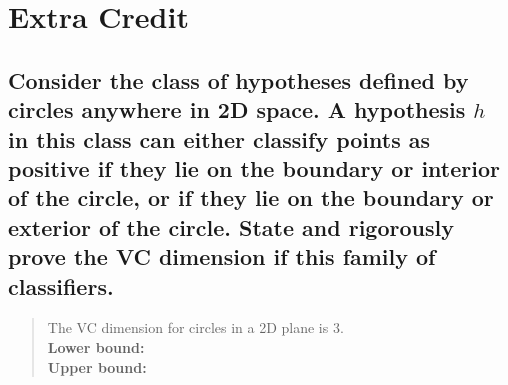 \documentclass[11pt]{article}
\begin{document}
\section{Extra Credit}

\subsection{Consider the class of hypotheses defined by circles anywhere in 2D space. A hypothesis $h$ in this class can either classify points as positive if they lie on the boundary or interior of the circle, or if they lie on the boundary or exterior of the circle. State and rigorously prove the VC dimension if this family of classifiers.}
\begin{quote}
	The VC dimension for circles in a 2D plane is 3.
	\\
	\textbf{Lower bound:}
	\\
	\textbf{Upper bound:}
\end{quote}
\end{document}
